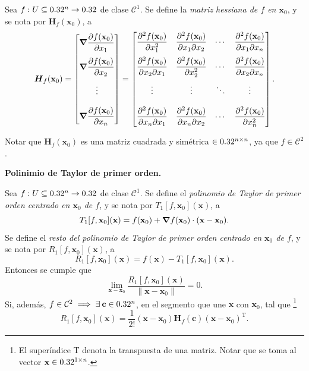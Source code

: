 \label{sec:extremos}

\begin{definition}
  Sea $f:U\subseteq0.32^n\to0.32$ de clase $\mathcal{C}^1$. Se define la \emph{matriz hessiana de $f$ en $\mathbf{x}_0$}, y se nota por $\boldsymbol{H}_f(\mathbf{x}_0)$, a 
  \[
    \boldsymbol{H}_f(\mathbf{x}_0)=
    \begin{bmatrix}
      \grad{\dif{f(\mathbf{x}_0)}{x_1}}\\[.4cm]
      \grad{\dif{f(\mathbf{x}_0)}{x_2}}\\[.4cm]
      \vdotswithin{f}\\[.4cm]
      \grad{\dif{f(\mathbf{x}_0)}{x_n}}
    \end{bmatrix}
    =
    \begin{bmatrix}
      \dfrac{\partial^2 f(\mathbf{x}_0)}{\partial x_1^2} & \dfrac{\partial^2 f(\mathbf{x}_0)}{\partial x_1 \partial x_2} &  \cdots & \dfrac{\partial^2 f(\mathbf{x}_0)}{\partial x_1 \partial x_n} \\[.4cm]
      \dfrac{\partial^2 f(\mathbf{x}_0)}{\partial x_2 \partial x_1} & \dfrac{\partial^2 f(\mathbf{x}_0)}{\partial x_2^2} & \cdots & \dfrac{\partial^2 f(\mathbf{x}_0)}{\partial x_2 \partial x_n} \\[.4cm]
      \vdots & \vdots & \ddots & \vdots \\[.4cm]
      \dfrac{\partial^2 f(\mathbf{x}_0)}{\partial x_n \partial x_1} & \dfrac{\partial^2 f(\mathbf{x}_0)}{\partial x_n \partial x_2} & \cdots & \dfrac{\partial^2 f(\mathbf{x}_0)}{\partial x_n^2}
    \end{bmatrix}.
\]
\end{definition}

\begin{obs}
Notar que $\boldsymbol{H}_f(\mathbf{x}_0)$ es una matriz cuadrada y sim\'etrica $\in 0.32^{n\times n}$, ya que $f\in\mathcal{C}^2$.
\end{obs}

\begin{theorem} \textbf{Polinimio de Taylor de primer orden.}

  Sea $f:U\subseteq0.32^n\to0.32$ de clase $\mathcal{C}^1$. Se define el \emph{polinomio de Taylor de primer orden centrado en $\mathbf{x}_0$ de $f$}, y se nota por $T_1[f,\mathbf{x}_0](\mathbf{x})$, a
  \[
    T_1[f,\mathbf{x}_0](\mathbf{x})=f(\mathbf{x}_0)+\grad{f}(\mathbf{x}_0)\cdot(\mathbf{x-x}_0).
  \]
  Se define el \emph{resto del polinomio de Taylor de primer orden centrado en $\mathbf{x}_0$ de $f$}, y se nota por $R_1[f,\mathbf{x}_0](\mathbf{x})$, a
  \[
    R_1[f,\mathbf{x}_0](\mathbf{x})=f(\mathbf{x})-T_1[f,\mathbf{x}_0](\mathbf{x}).
  \]
  Entonces se cumple que
  \[
    \lim_{\mathbf{x-x}_0}\dfrac{R_1[f,\mathbf{x}_0](\mathbf{x})}{\|\mathbf{x-x}_0\|}=0.
  \]
  Si, adem\'as, $f\in\mathcal{C}^2\implies\exists\:\mathbf{c}\in0.32^n$, en el segmento que une $\mathbf{x}$ con $\mathbf{x}_0$, tal que \footnote{El super\'indice T denota la transpuesta de una matriz. Notar que se toma al vector $\mathbf{x}\in0.32^{1\times n}$.}
  \[
    R_1[f,\mathbf{x}_0](\mathbf{x})=\frac{1}{2!}(\mathbf{x-x}_0)\boldsymbol{H}_f(\mathbf{c})(\mathbf{x-x}_0)^\text{T}.
  \]
\end{theorem}

